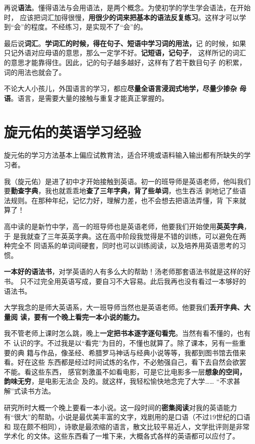 再说\textbf{语法}。懂得语法与会用语法，是两个概念。为使初学的学生学会语法，在开始时，
应该把词汇加得很慢，\textbf{用很少的词来把基本的语法反复练习}。这样才可以学
到“会”的程度。不经练习，是实现不了“会”的。

最后说\textbf{词汇}。\textbf{学词汇的时候，得在句子、短语中学习词的用法，}记
的时候，如果只记外语对应母语的意思，那么一定学不好。\textbf{记短语，记句子}，
这样所记的词汇的意思才能靠得住。因此，记的句子越多越好，这样有了若干数目句子
的积累，词的用法也就会了。

不论大人小孩儿，外国语言的学习，都应\textbf{尽量全语言浸润式地学，尽量少掺杂
  母语}。语言，是需要大量的接触与重复才能真正掌握的。

\section{旋元佑的英语学习经验}

旋元佑的学习方法基本上偏应试教育法，适合环境或语料输入输出都有所缺失的学习者。

我（旋元佑）是进了初中才开始接触到英语。初一的班导师是英语老师，他叫我们
要\textbf{勤查字典}，我也就乖乖地\textbf{查了三年字典，背了些单词}，也生吞活
剥地记了些语法规则。在那种年纪，记忆力好，理解力差，也不会想去把语法弄懂，背
下来就算了！

高中读的是新竹中学，高一的班导师也是英语老师，他要我们开始使用\textbf{英英字典}，于
是我就查了三年英英字典。这在高中阶段我觉得是不错的训练，可以避免在两种完全不
同语系的单词间硬套，同时也可以训练阅读，以及培养用英语思考的习惯。

\textbf{一本好的语法书}，对学英语的人有多么大的帮助！汤老师那套语法书就是这样的好书。
只不过完全用英语写成，要自习不大容易。此后我再也没有看过一本够好的语法书。

大学我念的是师大英语系，大一班导师当然也是英语老师。他要我们\textbf{丢开字典、大量阅
  读，要有一个晚上看完一本小说的能力。}

我不管老师上课时怎么跳，晚上\textbf{一定把书本逐字逐句看完}。当然有看不懂的，也有不
认识的字。不过我是以“看完”为目的，不懂也就算了。除了课本，另有一些重要的典
籍与作品，像圣经、希腊罗马神话与经典小说等等，我都到图书馆去借来看。好在这些
东西都是经过时间试炼的名作，不必勉强自己，看下去自然会欲罢不能。看这些东西，
感官刺激虽不如看电影，可是它比电影多一层\textbf{想象的空间，韵味无穷}，是电影无法企
及的。就这样，我轻松愉快地念完了大学…… “不求甚解”式读书方法。


研究所时大概一个晚上要看一本小说。这一段时间的\textbf{密集阅读}对我的英语能力
有“很大”的帮助。小说是最优美丰富的文字，戏剧用的是口语（不过19世纪的口语和
现在颇不相同），诗歌是最浓缩的语言，散文比较平易近人，文学批评则是非常学术化
的文体。这些东西看了一堆下来，大概各式各样的英语都可以应付了。

